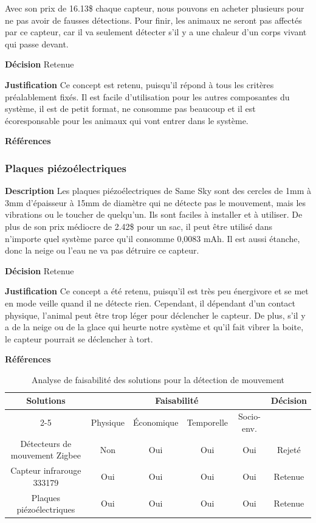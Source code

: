 Avec son prix de 16.13\$ chaque capteur, nous pouvons en acheter plusieurs pour ne pas avoir de fausses détections. Pour finir, les animaux ne seront pas affectés par ce capteur, car il va seulement détecter s’il y a une chaleur d’un corps vivant qui passe devant.
\smallskip

\noindent\textbf{Décision} Retenue
\smallskip

\noindent\textbf{Justification} Ce concept est retenu, puisqu'il répond à tous les critères préalablement fixés. Il est facile d’utilisation pour les autres composantes du système, il est de petit format, ne consomme pas beaucoup et il est écoresponsable pour les animaux qui vont entrer dans le système.
\smallskip


\noindent\textbf{Références} 
\cite{infrarouge1}

\subsubsection{Plaques piézoélectriques}
\label{sec:plaque}
\noindent\textbf{Description} Les plaques piézoélectriques de Same Sky sont des cercles de 1mm à 3mm d’épaisseur à 15mm de diamètre qui ne détecte pas le mouvement, mais les vibrations ou le toucher de quelqu’un. Ils sont faciles à installer et à utiliser. De plus de son prix médiocre de 2.42\$ pour un sac, il peut être utilisé dans n’importe quel système parce qu’il consomme 0,0083 mAh. Il est aussi étanche, donc la neige ou l’eau ne va pas détruire ce capteur.
\smallskip

\noindent\textbf{Décision} Retenue
\smallskip

\noindent\textbf{Justification} Ce concept a été retenu, puisqu’il est très peu énergivore et se met en mode veille quand il ne détecte rien. Cependant, il dépendant d’un contact physique, l’animal peut être trop léger pour déclencher le capteur. De plus, s’il y a de la neige ou de la glace qui heurte notre système et qu’il fait vibrer la boite, le capteur pourrait se déclencher à tort.
\smallskip


\noindent\textbf{Références} 
\cite{Piézoélectrique1}

\begin{table}[H]
    \centering
\begin{tabular}{|c|c|c|c|c|c|}
    \hline
    \centering
    \textbf{Solutions} & \multicolumn{4}{c|}{Faisabilité} & \textbf{Décision} \\
    \cline{2-5}
    & Physique & Économique & Temporelle & Socio-env. & \\
    \hline
    Détecteurs de mouvement Zigbee & Non & Oui & Oui & Oui & Rejeté \\
    \hline
    Capteur infrarouge 333179 & Oui & Oui & Oui & Oui & Retenue \\
    \hline
    Plaques piézoélectriques & Oui & Oui & Oui & Oui & Retenue \\
    \hline
\end{tabular}
\caption{Analyse de faisabilité des solutions pour la détection de mouvement}
\label{tab:faisabiliteMouvement}
\end{table}



